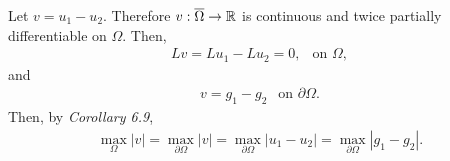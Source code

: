 \begin{questions}
\begin{solution}
Let $v=u_1-u_2$. Therefore $v:\overline{\Omega}\to\mathbb{R}$ is continuous and twice partially differentiable on $\Omega$. Then,
\begin{align*}
L v=L u_1-L u_2=0,~~\text{ on }\Omega,
\end{align*}
and
\begin{align*}
v=g_1-g_2~~\text{ on }\partial\Omega.
\end{align*}
Then, by \textsl{Corollary 6.9},
\begin{align*}
\max_{\Omega}|v|=\max_{\partial\Omega}|v|=\max_{\partial\Omega}|u_1-u_2|=\max_{\partial\Omega}|g_1-g_2|.
\end{align*}
\end{solution}
\end{questions}